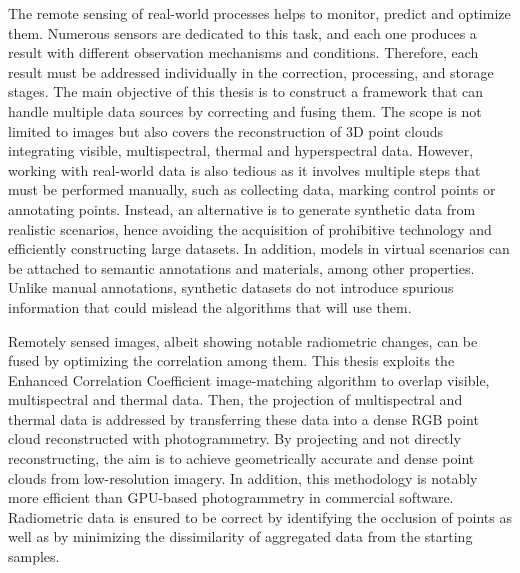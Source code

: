
\normalsize
\libertineNormal

The remote sensing of real-world processes helps to monitor, predict and optimize them. Numerous sensors are dedicated to this task, and each one produces a result with different observation mechanisms and conditions. Therefore, each result must be addressed individually in the correction, processing, and storage stages. The main objective of this thesis is to construct a framework that can handle multiple data sources by correcting and fusing them. The scope is not limited to images but also covers the reconstruction of 3D point clouds integrating visible, multispectral, thermal and hyperspectral data. However, working with real-world data is also tedious as it involves multiple steps that must be performed manually, such as collecting data, marking control points or annotating points. Instead, an alternative is to generate synthetic data from realistic scenarios, hence avoiding the acquisition of prohibitive technology and efficiently constructing large datasets. In addition, models in virtual scenarios can be attached to semantic annotations and materials, among other properties. Unlike manual annotations, synthetic datasets do not introduce spurious information that could mislead the algorithms that will use them. 


Remotely sensed images, albeit showing notable radiometric changes, can be fused by optimizing the correlation among them. This thesis exploits the Enhanced Correlation Coefficient image-matching algorithm to overlap visible, multispectral and thermal data. Then, the projection of multispectral and thermal data is addressed by transferring these data into a dense RGB point cloud reconstructed with photogrammetry. By projecting and not directly reconstructing, the aim is to achieve geometrically accurate and dense point clouds from low-resolution imagery. In addition, this methodology is notably more efficient than GPU-based photogrammetry in commercial software. Radiometric data is ensured to be correct by identifying the occlusion of points as well as by minimizing the dissimilarity of aggregated data from the starting samples. 


